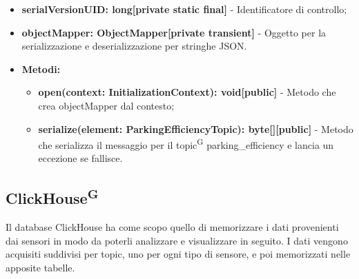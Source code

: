 \documentclass[8pt]{article}
\newcommand{\glossterm}[1]{#1\textsuperscript{G}} %
\begin{document}
\begin{itemize}
\begin{itemize}
\begin{itemize}
	\setlength\itemsep{0em}
            \item \textbf{serialVersionUID: long[private static final]} - Identificatore di controllo;
            \item \textbf{objectMapper: ObjectMapper[private transient]} - Oggetto per la serializzazione e deserializzazione per stringhe JSON.
        \end{itemize}
    \end{itemize}
    \begin{itemize}
	\setlength\itemsep{0em}
        \item \textbf{Metodi:}
        \begin{itemize}
	\setlength\itemsep{0em}
            \item \textbf{open(context: InitializationContext): void[public]} - Metodo che crea objectMapper dal contesto;
            \item \textbf{serialize(element: ParkingEfficiencyTopic): byte[][public]} - Metodo che serializza il messaggio per il \glossterm{topic} parking\_efficiency e lancia un eccezione se fallisce.
        \end{itemize}
    \end{itemize}
\end{itemize}
\clearpage
\subsection{\glossterm{ClickHouse}}
Il database ClickHouse ha come scopo quello di memorizzare i dati provenienti dai sensori in modo da poterli analizzare e visualizzare in seguito. I dati vengono acquisiti suddivisi per topic, uno per ogni tipo di sensore, e poi memorizzati nelle apposite tabelle.
\end{document}
